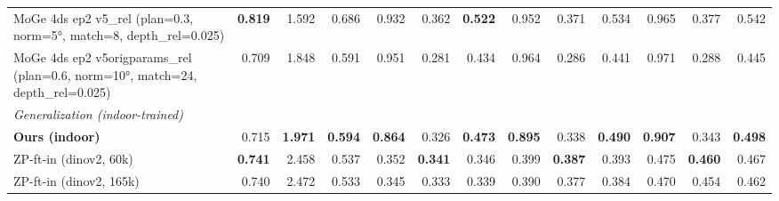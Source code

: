 \begin{table}[t]
{\begin{tabular}{l r r r r r r r r r r r r}
MoGe 4ds ep2 v5\_rel (plan=0.3, norm=5°, match=8, depth\_rel=0.025) & \textbf{0.819} & 1.592 & 0.686 & 0.932 & 0.362 & \textbf{0.522} & 0.952 & 0.371 & 0.534 & 0.965 & 0.377 & 0.542 \\
MoGe 4ds ep2 v5origparams\_rel (plan=0.6, norm=10°, match=24, depth\_rel=0.025) & 0.709 & 1.848 & 0.591 & 0.951 & 0.281 & 0.434 & 0.964 & 0.286 & 0.441 & 0.971 & 0.288 & 0.445 \\
\midrule
\multicolumn{13}{l}{\textit{Generalization (indoor-trained)}} \\
\textbf{Ours (indoor)} & 0.715 & \textbf{1.971} & \textbf{0.594} & \textbf{0.864} & 0.326 & \textbf{0.473} & \textbf{0.895} & 0.338 & \textbf{0.490} & \textbf{0.907} & 0.343 & \textbf{0.498} \\
ZP-ft-in (dinov2, 60k) & \textbf{0.741} & 2.458 & 0.537 & 0.352 & \textbf{0.341} & 0.346 & 0.399 & \textbf{0.387} & 0.393 & 0.475 & \textbf{0.460} & 0.467 \\
ZP-ft-in (dinov2, 165k) & 0.740 & 2.472 & 0.533 & 0.345 & 0.333 & 0.339 & 0.390 & 0.377 & 0.384 & 0.470 & 0.454 & 0.462 \\
\bottomrule
\end{tabular}%
}
\end{table}